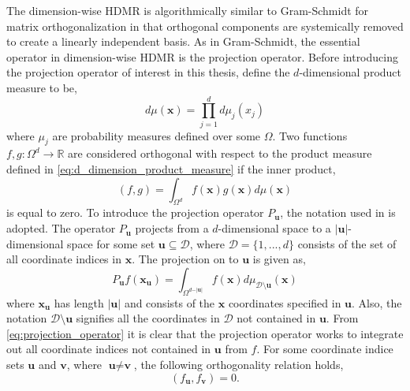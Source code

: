 The dimension-wise \ac{HDMR} is algorithmically similar to Gram-Schmidt for matrix orthogonalization in that orthogonal components are systemically removed to create a linearly independent basis. As in Gram-Schmidt, the essential operator in dimension-wise \ac{HDMR} is the projection operator. Before introducing the projection operator of interest in this thesis, define the $d$-dimensional product measure to be,
\begin{equation} \label{eq:d_dimension_product_measure}
    d\mu\left(\textbf{x}\right) = \prod_{j=1}^{d}
                              d\mu_{j}\left(x_j\right) 
\end{equation}
where $\mu_j$ are probability measures defined over some $\Omega$. Two functions $f,g:\Omega^d \rightarrow \mathbb{R}$ are considered orthogonal with respect to the product measure defined in \ref{eq:d_dimension_product_measure} if the inner product,
\begin{equation} \label{eq:inner_product}
   \left(f,g\right)=\int_{\Omega^d} f(\textbf{x})g(\textbf{x})d\mu(\textbf{x})
\end{equation} 
is equal to zero. To introduce the projection operator $P_\textbf{u}$, the notation used in \cite{Holtz} is adopted. The operator $P_\textbf{u}$ projects from a $d$-dimensional space to a $\vert\textbf{u}\vert$-dimensional space for some set $\textbf{u}\subseteq \mathcal{D}$, where $\mathcal{D}=\lbrace 1,...,d\rbrace$ consists of the set of all coordinate indices in $\textbf{x}$. The projection on to $\textbf{u}$ is given as,
\begin{equation} \label{eq:projection_operator}
    P_\textbf{u}f\left(\textbf{x}_{\textbf{u}}\right) =
     \int_{\Omega^{d-\vert\textbf{u}\vert}} 
      f\left(\textbf{x}\right)d\mu_{\mathcal{D}\setminus\textbf{u}}
       \left(\textbf{x}\right)
\end{equation}
where $\textbf{x}_\textbf{u}$ has length $\vert\textbf{u}\vert$ and consists of the $\textbf{x}$ coordinates specified in $\textbf{u}$. Also, the notation $\mathcal{D}\setminus\textbf{u}$ signifies all the coordinates in $\mathcal{D}$ not contained in $\textbf{u}$. From \ref{eq:projection_operator} it is clear that the projection operator works to integrate out all coordinate indices not contained in $\textbf{u}$ from $f$. For some coordinate indice sets $\textbf{u}$ and $\textbf{v}$, where $\textbf{u}\neq\textbf{v}$, the following orthogonality relation holds,
\begin{equation} \label{eq:orthogonality_relation}
    \left(f_\textbf{u},f_\textbf{v}\right) = 0.
\end{equation}
